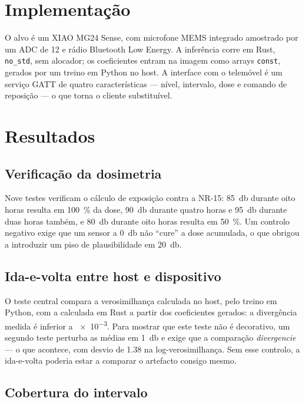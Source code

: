 \documentclass[10pt,a4paper]{article}
\begin{document}
\section{Implementação}

O alvo é um XIAO MG24 Sense, com microfone MEMS integrado amostrado por um ADC de
\SI{12}{\bit} e rádio Bluetooth Low Energy. A inferência corre em Rust, \texttt{no\_std},
sem alocador; os coeficientes entram na imagem como arrays \texttt{const}, gerados por um
treino em Python no host. A interface com o telemóvel é um serviço GATT de quatro
características --- nível, intervalo, dose e comando de reposição --- o que torna o cliente
substituível.

\section{Resultados}

\subsection{Verificação da dosimetria}

Nove testes verificam o cálculo de exposição contra a NR-15: \SI{85}{\decibel} durante oito
horas resulta em \SI{100}{\percent} da dose, \SI{90}{\decibel} durante quatro horas e
\SI{95}{\decibel} durante duas horas também, e \SI{80}{\decibel} durante oito horas resulta
em \SI{50}{\percent}. Um controlo negativo exige que um sensor a \SI{0}{\decibel} não
``cure'' a dose acumulada, o que obrigou a introduzir um piso de plausibilidade em
\SI{20}{\decibel}.

\subsection{Ida-e-volta entre host e dispositivo}

O teste central compara a verosimilhança calculada no host, pelo treino em Python, com a
calculada em Rust a partir dos coeficientes gerados: a divergência medida é inferior a
\num{e-3}. Para mostrar que este teste não é decorativo, um segundo teste perturba as médias
em \SI{1}{\decibel} e exige que a comparação \emph{divergencie} --- o que acontece, com
desvio de \num{1.38} na log-verosimilhança. Sem esse controlo, a ida-e-volta poderia estar a
comparar o artefacto consigo mesmo.

\subsection{Cobertura do intervalo}
\end{document}
